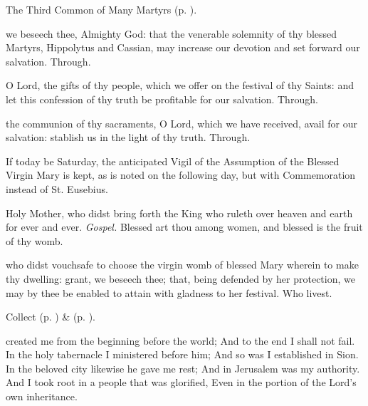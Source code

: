 
\begin{rubric}
	The Third Common of Many Martyrs (p. \pageref{CommonMartyrsIII}).
\end{rubric}

\collect
{} we beseech thee, Almighty God: that the venerable solemnity of thy blessed Martyrs, Hippolytus and Cassian, may increase our devotion and set forward our salvation. Through.

\secret
{} O Lord, the gifts of thy people, which we offer on the festival of thy Saints: and let this confession of thy truth be profitable for our salvation. Through.

\postcommunion
{} the communion of thy sacraments, O Lord, which we have received, avail for our salvation: stablish us in the light of thy truth. Through.


\begin{rubric}
	If today be Saturday, the anticipated Vigil of the Assumption of the Blessed Virgin Mary is kept, as is noted on the following day, but with Commemoration  instead of St. Eusebius.
\end{rubric}


\clearpage
{}

\introit
{} Holy Mother, who didst bring forth the King who ruleth over heaven and earth for ever and ever. \textit{Gospel.} Blessed art thou among women, and blessed is the fruit of thy womb.

\collect
{} who didst vouchsafe to choose the virgin womb of blessed Mary wherein to make thy dwelling: grant, we beseech thee; that, being defended by her protection, we may by thee be enabled to attain with gladness to her festival. Who livest.

\begin{rubric}
	 Collect  (p. \pageref{EusebiusCollect}) \&   (p. \pageref{SPSaints}).
\end{rubric}

 created me from the beginning before the world; And to the end I shall not fail. In the holy tabernacle I ministered before him; And so was I established in Sion. In the beloved city likewise he gave me rest; And in Jerusalem was my authority. And I took root in a people that was glorified, Even in the portion of the Lord's own inheritance. 


